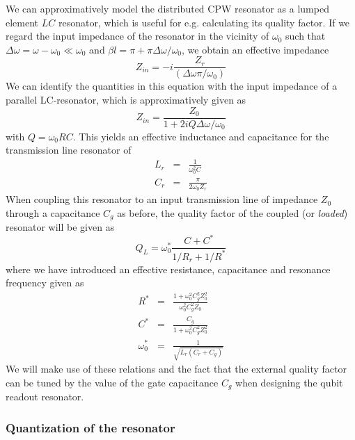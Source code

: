 We can approximatively model the distributed CPW resonator as a lumped element $LC$ resonator, which is useful for e.g. calculating its quality factor. If we regard the input impedance of the resonator in the vicinity of $\omega_0$ such that $\Delta \omega = \omega -\omega_0 \ll \omega_0$ and $\beta l = \pi +\pi\Delta \omega /\omega_0$, we obtain an effective impedance
%
\begin{equation}
Z_{in} = -i\frac{Z_{r}}{(\Delta \omega \pi / \omega_0)}
\end{equation}
%
We can identify the quantities in this equation with the input impedance of a parallel LC-resonator, which is approximatively given as
%
\begin{equation}
Z_{in} = \frac{Z_0}{1+2i Q \Delta \omega / \omega_0}
\end{equation}
%
with $Q=\omega_0 RC$. This yields an effective inductance and capacitance for the transmission line resonator of
%
\begin{eqnarray}
L_{r} & = & \frac{1}{\omega_0^2 C} \\
C_{r} & = & \frac{\pi}{2\omega_0 Z_r}
\end{eqnarray}
%
When coupling this resonator to an input transmission line of impedance $Z_0$ through a  capacitance $C_g$ as before, the quality factor of the coupled (or {\it loaded}) resonator will be given as
%
\begin{equation}
Q_L = \omega_0^* \frac{C+C^*}{1/R_{r}+1/R^*}
\end{equation}
%
where we have introduced an effective resistance, capacitance and resonance frequency given as
%
\begin{eqnarray}
R^* & = & \frac{1+\omega_0^2 C_g^2 Z_0^2}{\omega_0^2 C_g^2 Z_0} \\
C^* & = & \frac{C_g}{1+\omega_0^2 C_g^2 Z_0^2} \\
\omega_0^* & = & \frac{1}{\sqrt{L_r(C_r+C_g)}}
\end{eqnarray}
%
We will make use of these relations and the fact that the external quality factor can be tuned by the value of the gate capacitance $C_g$ when designing the qubit readout resonator. 

\subsubsection{Quantization of the resonator}

